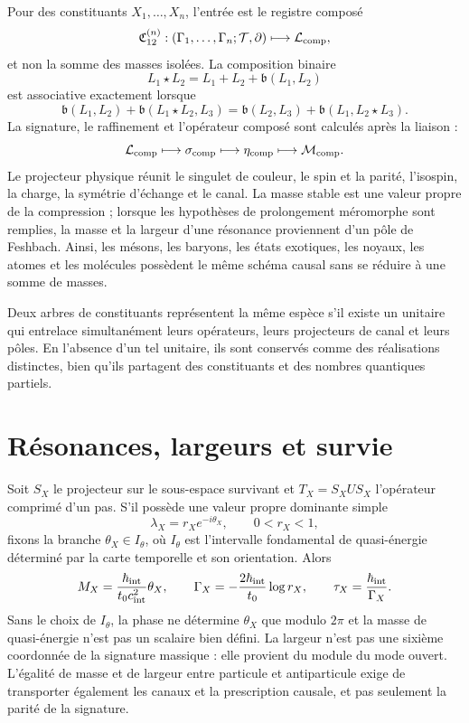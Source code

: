 Pour des constituants \(X_1,\ldots,X_n\), l'entrée est le registre composé
\[
 \mathfrak C_{12}^{(n)}:
 (\Gamma_1,\ldots,\Gamma_n;\mathcal T,\partial)
 \longmapsto\mathcal L_{\rm comp},
\]
et non la somme des masses isolées. La composition binaire
\[
 L_1\star L_2=L_1+L_2+\mathfrak b(L_1,L_2)
\]
est associative exactement lorsque
\[
 \mathfrak b(L_1,L_2)+\mathfrak b(L_1\star L_2,L_3)
 =\mathfrak b(L_2,L_3)+\mathfrak b(L_1,L_2\star L_3).
\]
La signature, le raffinement et l'opérateur composé sont calculés après la
liaison :
\[
 \mathcal L_{\rm comp}\longmapsto\sigma_{\rm comp}
 \longmapsto\eta_{\rm comp}\longmapsto\mathcal M_{\rm comp}.
\]
Le projecteur physique réunit le singulet de couleur, le spin et la parité, l'isospin, la charge,
la symétrie d'échange et le canal. La masse stable est une valeur propre de la
compression ; lorsque les hypothèses de prolongement méromorphe sont remplies, la masse
et la largeur d'une résonance proviennent d'un pôle de Feshbach. Ainsi,
les mésons, les baryons, les états exotiques, les noyaux, les atomes et
les molécules possèdent le même schéma causal sans se réduire à une somme de masses.

Deux arbres de constituants représentent la même espèce s'il existe un
unitaire qui entrelace simultanément leurs opérateurs, leurs projecteurs de canal et leurs
pôles. En l'absence d'un tel unitaire, ils sont conservés comme des réalisations distinctes,
bien qu'ils partagent des constituants et des nombres quantiques partiels.

\section{Résonances, largeurs et survie}

Soit \(S_X\) le projecteur sur le sous-espace survivant et
\(T_X=S_X U S_X\) l'opérateur comprimé d'un pas. S'il possède une valeur propre
dominante simple
\[
 \lambda_X=r_X e^{-i\theta_X},\qquad 0<r_X<1,
\]
fixons la branche \(\theta_X\in I_\theta\), où \(I_\theta\) est l'intervalle
fondamental de quasi-énergie déterminé par la carte temporelle et son orientation.
Alors
\[
 M_X=\frac{\hbar_{\rm int}}{t_0c_{\rm int}^2}\theta_X,
 \qquad
 \Gamma_X=-\frac{2\hbar_{\rm int}}{t_0}\log r_X,
 \qquad
 \tau_X=\frac{\hbar_{\rm int}}{\Gamma_X}.
\]
Sans le choix de \(I_\theta\), la phase ne détermine \(\theta_X\) que modulo
\(2\pi\) et la masse de quasi-énergie n'est pas un scalaire bien défini.
La largeur n'est pas une sixième coordonnée de la signature massique : elle provient du module
du mode ouvert. L'égalité de masse et de largeur entre particule et
antiparticule exige de transporter également les canaux et la prescription causale, et pas seulement
la parité de la signature.

